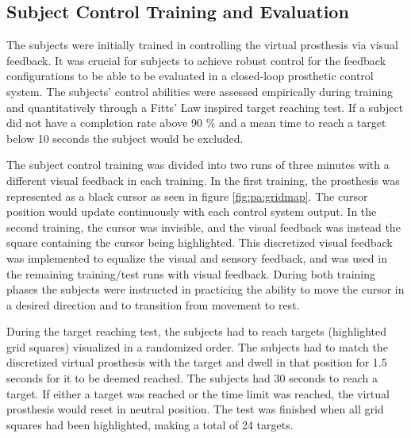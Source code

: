 \subsection{Subject Control Training and Evaluation} \label{sec:pa:subjectcontrol}
The subjects were initially trained in controlling the virtual prosthesis via visual feedback. It was crucial for subjects to achieve robust control for the feedback configurations to be able to be evaluated in a closed-loop prosthetic control system. The subjects' control abilities were assessed empirically during training and quantitatively through a Fitts' Law inspired target reaching test. If a subject did not have a completion rate above 90 $\%$ and a mean time to reach a target below 10 seconds the subject would be excluded. 

The subject control training was divided into two runs of three minutes with a different visual feedback in each training. In the first training, the prosthesis was represented as a black cursor as seen in figure \ref{fig:pa:gridmap}. The cursor position would update continuously with each control system output. In the second training, the cursor was invisible, and the visual feedback was instead the square containing the cursor being highlighted. This discretized visual feedback was implemented to equalize the visual and sensory feedback, and was used in the remaining training/test runs with visual feedback. During both training phases the subjects were instructed in practicing the ability to move the cursor in a desired direction and to transition from movement to rest. 

During the target reaching test, the subjects had to reach targets (highlighted grid squares) visualized in a randomized order. The subjects had to match the discretized virtual prosthesis with the target and dwell in that position for 1.5 seconds for it to be deemed reached. The subjects had 30 seconds to reach a target. If either a target was reached or the time limit was reached, the virtual prosthesis would reset in neutral position. The test was finished when all grid squares had been highlighted, making a total of 24 targets. 